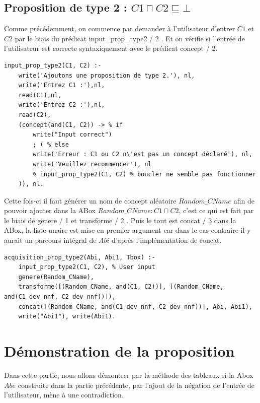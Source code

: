 \documentclass{article}
\begin{document}
\subsection{Proposition de type 2 : $ C1 \sqcap C2 \sqsubseteq \bot $ }
Comme précédemment, on commence par demander à l'utilisateur d'entrer $ C1 $ et $ C2 $ par le biais du prédicat \color{blue} input\_prop\_type2 / 2 \color{black}. Et on vérifie si l'entrée de l'utilisateur est correcte syntaxiquement avec le prédicat \color{blue}concept / 2\color{black}.
\begin{verbatim}
input_prop_type2(C1, C2) :-
    write('Ajoutons une proposition de type 2.'), nl,
    write('Entrez C1 :'),nl, 
    read(C1),nl,
    write('Entrez C2 :'),nl, 
    read(C2),
    (concept(and(C1, C2)) -> % if 
        write("Input correct")
        ; ( % else
        write('Erreur : C1 ou C2 n\'est pas un concept déclaré'), nl,
        write('Veuillez recommencer'), nl
        % input_prop_type2(C1, C2) % boucler ne semble pas fonctionner
    )), nl.
\end{verbatim}
Cette fois-ci il faut générer un nom de concept aléatoire $ Random\_CName $ afin de pouvoir ajouter dans la ABox $ Random\_CName : C1 \sqcap C2 $, c'est ce qui est fait par le biais de \color{blue} genere / 1 \color{black} et \color{blue} transforme / 2 \color{black}. Puis le tout est \color{blue} concat / 3 \color{black} dans la ABox, la liste unaire est mise en premier argument car dans le cas contraire il y aurait un parcours intégral de $Abi$ d'après l'implémentation de \color{blue}concat\color{black}.
\begin{verbatim}
acquisition_prop_type2(Abi, Abi1, Tbox) :- 
    input_prop_type2(C1, C2), % User input
    genere(Random_CName),
    transforme([(Random_CName, and(C1, C2))], [(Random_CName, and(C1_dev_nnf, C2_dev_nnf))]), 
    concat([(Random_CName, and(C1_dev_nnf, C2_dev_nnf))], Abi, Abi1), 
    write("Abi1"), write(Abi1).
\end{verbatim}

\section{Démonstration de la proposition}
Dans cette partie, nous allons démontrer par la méthode des tableaux si la Abox $ Abe $ construite dans la partie précédente, par l'ajout de la négation de l'entrée de l'utilisateur, mène à une contradiction.
\end{document}
